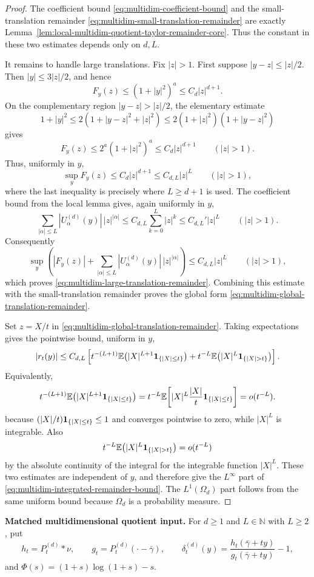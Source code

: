 \begin{proof}
The coefficient bound \eqref{eq:multidim-coefficient-bound} and the
small-translation remainder
\eqref{eq:multidim-small-translation-remainder} are exactly
Lemma~\ref{lem:local-multidim-quotient-taylor-remainder-core}.  Thus the
constant in these two estimates depends only on \(d,L\).

It remains to handle large translations.  Fix \(|z|>1\).  First suppose
\(|y-z|\le |z|/2\).  Then \(|y|\le3|z|/2\), and hence
\[
F_y(z)\le (1+|y|^2)^a\le C_d|z|^{d+1}.
\]
On the complementary region \(|y-z|>|z|/2\), the elementary estimate
\[
1+|y|^2
\le 2(1+|y-z|^2+|z|^2)
\le 2(1+|z|^2)(1+|y-z|^2)
\]
gives
\[
F_y(z)
\le 2^a(1+|z|^2)^a
\le C_d|z|^{d+1}
\qquad(|z|>1).
\]
Thus, uniformly in \(y\),
\[
\sup_y F_y(z)\le C_d|z|^{d+1}\le C_{d,L}|z|^L
\qquad(|z|>1),
\]
where the last inequality is precisely where \(L\ge d+1\) is used.  The
coefficient bound from the local lemma gives, again uniformly in \(y\),
\[
\sum_{|\alpha|\le L}|U_\alpha^{(d)}(y)|\,|z|^{|\alpha|}
\le C_{d,L}\sum_{k=0}^{L}|z|^k
\le C_{d,L}'|z|^L
\qquad(|z|>1).
\]
Consequently
\[
\sup_y\left(
|F_y(z)|
+\sum_{|\alpha|\le L}|U_\alpha^{(d)}(y)|\,|z|^{|\alpha|}
\right)
\le C_{d,L}|z|^L
\qquad(|z|>1),
\]
which proves \eqref{eq:multidim-large-translation-remainder}.  Combining
this estimate with the small-translation remainder proves the global form
\eqref{eq:multidim-global-translation-remainder}.

Set \(z=X/t\) in \eqref{eq:multidim-global-translation-remainder}.  Taking
expectations gives the pointwise bound, uniform in \(y\),
\[
|r_t(y)|
\le
C_{d,L}\left[
t^{-(L+1)}
\EE\!\left(|X|^{L+1}{\bf1}_{\{|X|\le t\}}\right)
+t^{-L}
\EE\!\left(|X|^L{\bf1}_{\{|X|>t\}}\right)
\right].
\]
Equivalently,
\[
t^{-(L+1)}
\mathbb{E}\!\left(|X|^{L+1}{\bf1}_{\{|X|\le t\}}\right)
=
t^{-L}
\mathbb{E}\!\left[
|X|^L\frac{|X|}{t}{\bf1}_{\{|X|\le t\}}
\right]
=o(t^{-L}).
\]
because \((|X|/t){\bf1}_{\{|X|\le t\}}\le1\) and converges pointwise to
zero, while \(|X|^L\) is integrable.  Also
\[
t^{-L}\EE\!\left(|X|^L{\bf1}_{\{|X|>t\}}\right)=o(t^{-L})
\]
by the absolute continuity of the integral for the integrable function
\(|X|^L\).  These two estimates are independent of \(y\), and therefore give
the \(L^\infty\) part of \eqref{eq:multidim-integrated-remainder-bound}.
The \(L^1(\Omega_d)\) part follows from the same uniform bound because
\(\Omega_d\) is a probability measure.
\end{proof}

\medskip
\noindent\textbf{Matched multidimensional quotient input.}
For \(d\ge1\) and \(L\in\mathbb N\) with \(L\ge2\), put
\[
h_t=P_t^{(d)}*\nu,\qquad
g_t=P_t^{(d)}(\cdot-\bar{\gamma}),\qquad
\delta_t^{(d)}(y)=
\frac{h_t(\bar{\gamma}+ty)}{g_t(\bar{\gamma}+ty)}-1,
\]
and \(\Phi(s)=(1+s)\log(1+s)-s\).

